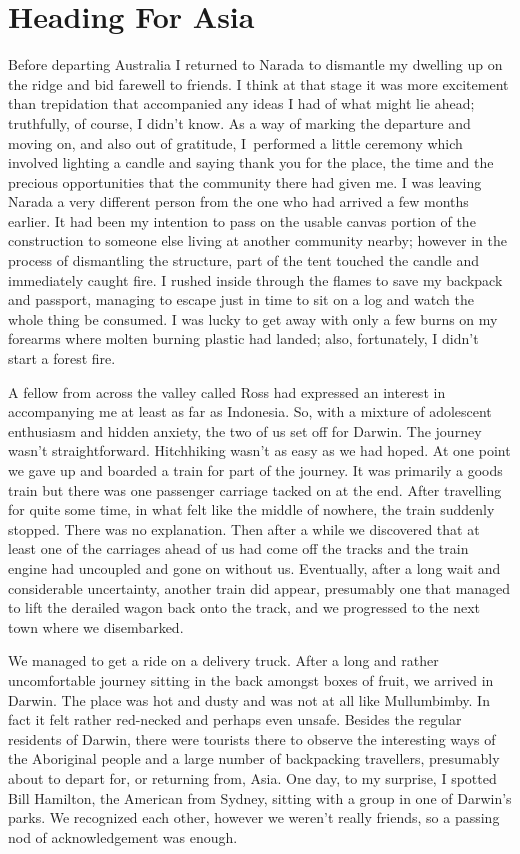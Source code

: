 \chapter{Heading For Asia}

Before departing Australia I returned to Narada to dismantle my dwelling
up on the ridge and bid farewell to friends. I think at that stage it
was more excitement than trepidation that accompanied any ideas I had of
what might lie ahead; truthfully, of course, I didn't know. As a way of
marking the departure and moving on, and also out of gratitude, I~performed
a little ceremony which involved lighting a candle and saying
thank you for the place, the time and the precious opportunities that
the community there had given me. I was leaving Narada a very different
person from the one who had arrived a few months earlier. It had been my
intention to pass on the usable canvas portion of the construction to
someone else living at another community nearby; however in the process
of dismantling the structure, part of the tent touched the candle and
immediately caught fire. I rushed inside through the flames to save my
backpack and passport, managing to escape just in time to sit on a log
and watch the whole thing be consumed. I was lucky to get away with only
a few burns on my forearms where molten burning plastic had landed;
also, fortunately, I didn't start a forest fire.

A fellow from across the valley called Ross had expressed an interest in
accompanying me at least as far as Indonesia. So, with a mixture of
adolescent enthusiasm and hidden anxiety, the two of us set off for
Darwin. The journey wasn't straightforward. Hitchhiking wasn't as easy
as we had hoped. At one point we gave up and boarded a train for part of
the journey. It was primarily a goods train but there was one passenger
carriage tacked on at the end. After travelling for quite some time, in
what felt like the middle of nowhere, the train suddenly stopped. There
was no explanation. Then after a while we discovered that at least one
of the carriages ahead of us had come off the tracks and the train
engine had uncoupled and gone on without us. Eventually, after a long
wait and considerable uncertainty, another train did appear, presumably
one that managed to lift the derailed wagon back onto the track, and we
progressed to the next town where we disembarked.

We managed to get a ride on a
delivery truck. After a long and rather uncomfortable journey sitting in
the back amongst boxes of fruit, we arrived in Darwin. The place was hot
and dusty and was not at all like Mullumbimby. In fact it felt rather
red-necked and perhaps even unsafe. Besides the regular residents of
Darwin, there were tourists there to observe the interesting ways of the
Aboriginal people and a large number of backpacking travellers,
presumably about to depart for, or returning from, Asia. One day, to my
surprise, I spotted Bill Hamilton, the American from Sydney, sitting
with a group in one of Darwin's parks. We recognized each other, however
we weren't really friends, so a passing nod of acknowledgement was
enough.

